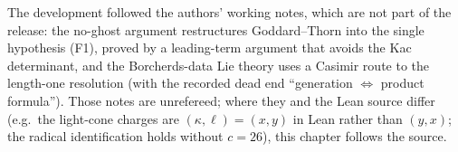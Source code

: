 The development followed the authors' working notes, which are not part of the release: the no-ghost argument
restructures Goddard--Thorn into the single hypothesis (F1), proved by a leading-term argument that avoids the Kac
determinant, and the Borcherds-data Lie theory uses a Casimir route to the length-one resolution (with the recorded dead
end ``generation $\Leftrightarrow$ product formula'').  Those notes are unrefereed; where they and the Lean source differ (e.g.\ the
light-cone charges are $(\kappa,\ell)=(x,y)$ in Lean rather than $(y,x)$; the radical identification holds without $c=26$), this chapter
follows the source.
